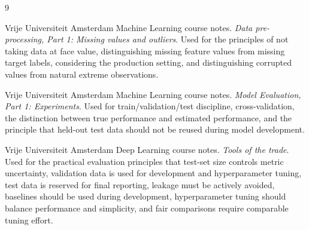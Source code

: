 \documentclass[11pt,a4paper]{article}
\begin{document}
\newpage


\newpage
\begin{thebibliography}{9}

Vrije Universiteit Amsterdam Machine Learning course notes.
\textit{Data pre-processing, Part 1: Missing values and outliers}.
Used for the principles of not taking data at face value, distinguishing missing feature values from missing target labels, considering the production setting, and distinguishing corrupted values from natural extreme observations.

Vrije Universiteit Amsterdam Machine Learning course notes.
\textit{Model Evaluation, Part 1: Experiments}.
Used for train/validation/test discipline, cross-validation, the distinction between true performance and estimated performance, and the principle that held-out test data should not be reused during model development.

Vrije Universiteit Amsterdam Deep Learning course notes.
\textit{Tools of the trade}.
Used for the practical evaluation principles that test-set size controls metric uncertainty, validation data is used for development and hyperparameter tuning, test data is reserved for final reporting, leakage must be actively avoided, baselines should be used during development, hyperparameter tuning should balance performance and simplicity, and fair comparisons require comparable tuning effort.

\end{thebibliography}
\end{document}
